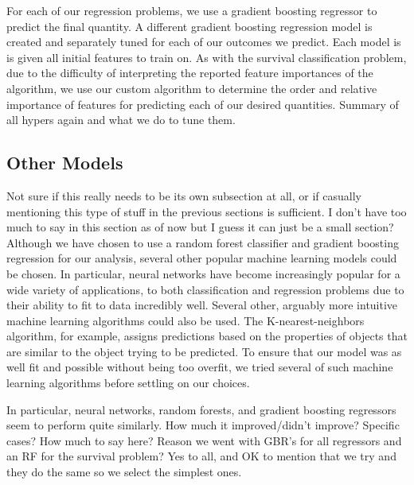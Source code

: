 \documentclass[fleqn,usenatbib]{mnras}
\newcommand\edits[1]{{\color{red}#1}}
\begin{document}
For each of our regression problems, we use a gradient boosting regressor to predict the final quantity. A different gradient boosting regression model is created and separately tuned for each of our outcomes we predict. Each model is is given all initial features to train on. As with the survival classification problem, due to the difficulty of interpreting the reported feature importances of the algorithm, we use our custom algorithm to determine the order and relative importance of features for predicting each of our desired quantities. \edits{Summary of all hypers again and what we do to tune them.}

\subsection{Other Models}
\label{sec:other models} %
\edits{Not sure if this really needs to be its own subsection at all, or if casually mentioning this type of stuff in the previous sections is sufficient. I don't have too much to say in this section as of now but I guess it can just be a small section?}
Although we have chosen to use a random forest classifier and gradient boosting regression for our analysis, several other popular machine learning models could be chosen. In particular, neural networks have become increasingly popular for a wide variety of applications, to both classification and regression problems due to their ability to fit to data incredibly well. Several other, arguably more intuitive machine learning algorithms could also be used. The K-nearest-neighbors algorithm, for example, assigns predictions based on the properties of objects that are similar to the object trying to be predicted. To ensure that our model was as well fit and possible without being too overfit, we tried several of such machine learning algorithms before settling on our choices.

In particular, neural networks, random forests, and gradient boosting regressors seem to perform quite similarly. \edits{How much it improved/didn't improve? Specific cases? How much to say here? Reason we went with GBR's for all regressors and an RF for the survival problem? Yes to all, and OK to mention that we try and they do the same so we select the simplest ones.}
\end{document}
